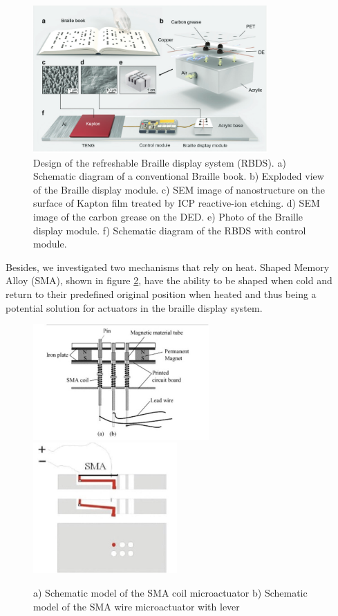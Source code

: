 \begin{figure}\centering
    \includegraphics[width=0.8\textwidth]{figures/teng.png}
\caption{Design of the refreshable Braille display system (RBDS). a) Schematic diagram of a conventional Braille book. b) Exploded view of the Braille display module. c) SEM image of nanostructure on the surface of Kapton film treated by ICP reactive-ion etching. d) SEM image of the carbon grease on the DED. e) Photo of the Braille display module. f) Schematic diagram of the RBDS with control module.}
\label{fig:teng.png}
\end{figure}

Besides, we investigated two mechanisms that rely on heat. Shaped Memory Alloy (SMA), shown in figure \ref{fig:sma}, have the ability to be shaped when cold and return to their predefined original position when heated and thus being a potential solution for actuators in the braille display system.
\begin{figure}\centering
    \includegraphics[width=0.6\textwidth]{figures/sma-coil.png}
    \includegraphics[height=5cm]{figures/sma-mechanism.png}
\caption{ a) Schematic model of the SMA coil microactuator b) Schematic model of the SMA wire microactuator with lever}
\label{fig:sma}
\end{figure}

